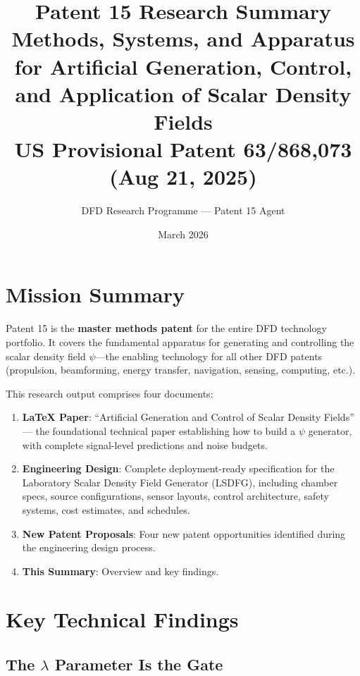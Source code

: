 \documentclass[11pt,a4paper]{article}
\title{\textbf{Patent 15 Research Summary}\\[6pt]
\large Methods, Systems, and Apparatus for Artificial Generation,
Control, and Application of Scalar Density Fields\\[6pt]
\normalsize US Provisional Patent 63/868,073 (Aug 21, 2025)}
\author{DFD Research Programme --- Patent 15 Agent}
\date{March 2026}
\begin{document}
\maketitle

\section{Mission Summary}

Patent 15 is the \textbf{master methods patent} for the entire DFD
technology portfolio.  It covers the fundamental apparatus for
generating and controlling the scalar density field $\psi$---the
enabling technology for all other DFD patents (propulsion,
beamforming, energy transfer, navigation, sensing, computing, etc.).

This research output comprises four documents:

\begin{enumerate}[nosep]
\item \textbf{LaTeX Paper}: ``Artificial Generation and Control of
Scalar Density Fields'' --- the foundational technical paper
establishing how to build a $\psi$ generator, with complete
signal-level predictions and noise budgets.

\item \textbf{Engineering Design}: Complete deployment-ready
specification for the Laboratory Scalar Density Field Generator
(LSDFG), including chamber specs, source configurations, sensor
layouts, control architecture, safety systems, cost estimates,
and schedules.

\item \textbf{New Patent Proposals}: Four new patent opportunities
identified during the engineering design process.

\item \textbf{This Summary}: Overview and key findings.
\end{enumerate}

\section{Key Technical Findings}

\subsection{The $\lambda$ Parameter Is the Gate}
\end{document}
